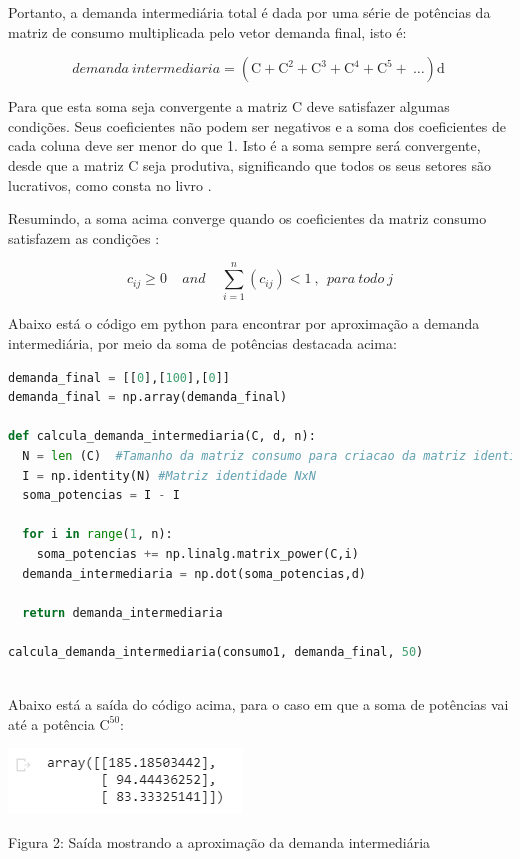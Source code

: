 \documentclass[a4paper, 12pt]{article}
\begin{document}
Portanto, a demanda intermediária total é dada por uma série de potências da matriz de consumo multiplicada pelo vetor demanda final, isto é:

$$\boxed{\ demanda\ intermediaria=\left(\mathrm{C}+\mathrm{C^2}+\mathrm{C^3}+\mathrm{C^4}+\mathrm{C^5}+\ \dots \right)\mathrm{d}\ \ }$$

Para que esta soma seja convergente a matriz $\mathrm{C}$ deve satisfazer algumas condições. Seus coeficientes não podem ser negativos e a soma dos coeficientes de cada coluna deve ser menor do que 1. Isto é a soma sempre será convergente, desde que a matriz $\mathrm{C}$ seja produtiva, significando que todos os seus setores são lucrativos, como consta no livro \citep{livro_howard}.

Resumindo, a soma acima converge quando os coeficientes da matriz consumo satisfazem as condições \citep{livro_miller}: 

$$c_{ij}\ge 0\ \ \ \ \ and\ \ \ \ \ \sum _{i=1}^n\left(c_{ij}\right)<1\ {,}\ \ para\ todo\ j$$

Abaixo está o código em python para encontrar por aproximação a demanda intermediária, por meio da soma de potências destacada acima:\\

\begin{lstlisting}[language=Python, caption=Demanda intermediária com soma de potências, label=listing_MatrizLeotiefpot]
demanda_final = [[0],[100],[0]]
demanda_final = np.array(demanda_final)

def calcula_demanda_intermediaria(C, d, n):
  N = len (C)  #Tamanho da matriz consumo para criacao da matriz identidade
  I = np.identity(N) #Matriz identidade NxN
  soma_potencias = I - I

  for i in range(1, n):
    soma_potencias += np.linalg.matrix_power(C,i)
  demanda_intermediaria = np.dot(soma_potencias,d)

  return demanda_intermediaria

calcula_demanda_intermediaria(consumo1, demanda_final, 50)

\end{lstlisting}\\

Abaixo está a saída do código acima, para o caso em que a soma de potências vai até a potência $\mathrm{C^{50}}$:

 \begin{center}
    \includegraphics{saida_demanda_intermediaria.PNG}
    
    Figura 2: Saída mostrando a aproximação da demanda intermediária
\end{center}\\
\end{document}
